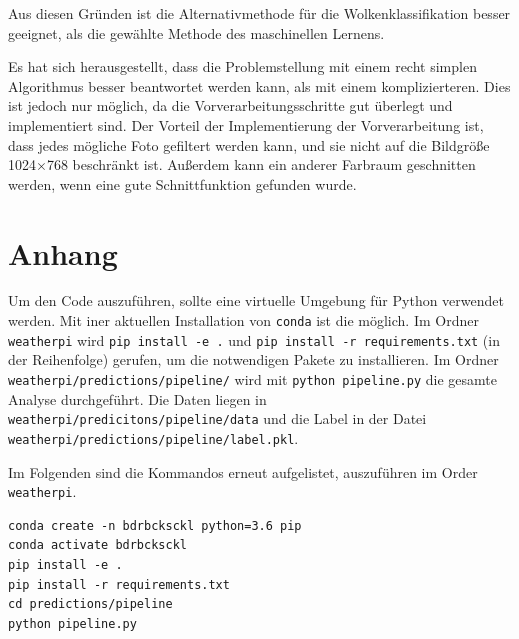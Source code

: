 Aus diesen Gründen ist die Alternativmethode für die
Wolkenklassifikation besser geeignet, als die gewählte Methode des
maschinellen Lernens.

Es hat sich herausgestellt, dass die Problemstellung mit einem recht
simplen Algorithmus besser beantwortet werden kann, als mit einem
komplizierteren. Dies ist jedoch nur möglich, da die
Vorverarbeitungsschritte gut überlegt und implementiert sind. Der
Vorteil der Implementierung der Vorverarbeitung ist, dass jedes mögliche
Foto gefiltert werden kann, und sie nicht auf die Bildgröße 1024$\times$768
beschränkt ist. Außerdem kann ein anderer Farbraum geschnitten werden,
wenn eine gute Schnittfunktion gefunden wurde.

\newpage

\hypertarget{anhang}{%
\section*{Anhang}\label{anhang}}

Um den Code auszuführen, sollte eine virtuelle Umgebung für Python
verwendet werden. Mit iner aktuellen Installation von \texttt{conda} ist
die möglich. Im Ordner \texttt{weatherpi} wird
\texttt{pip\ install\ -e\ .} und
\texttt{pip\ install\ -r\ requirements.txt} (in der Reihenfolge)
gerufen, um die notwendigen Pakete zu installieren. Im Ordner
\texttt{weatherpi/predictions/pipeline/} wird mit
\texttt{python\ pipeline.py} die gesamte Analyse durchgeführt. Die Daten
liegen in \texttt{weatherpi/predicitons/pipeline/data} und die Label in
der Datei \linebreak\texttt{weatherpi/predictions/pipeline/label.pkl}.

Im Folgenden sind die Kommandos erneut aufgelistet, auszuführen im Order
\texttt{weatherpi}.

\begin{verbatim}
conda create -n bdrbcksckl python=3.6 pip
conda activate bdrbcksckl
pip install -e .
pip install -r requirements.txt
cd predictions/pipeline
python pipeline.py
\end{verbatim}

\newpage

